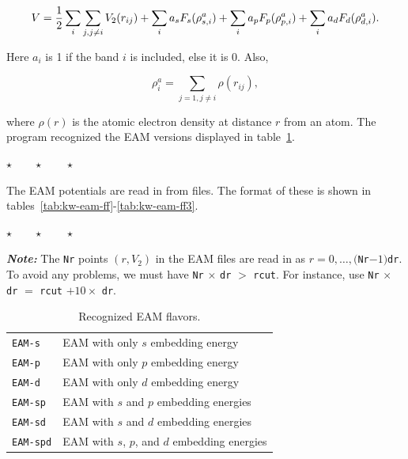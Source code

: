 \documentclass[a4paper,12pt,pdftex,onecolumn]{article}
\newcommand{\stars}{\begin{center}%
\vspace{1em plus 0.5em minus 0.5em}%
$\star \qquad \star \qquad \star$%
\vspace{1em plus 0.5em minus 0.5em}%
\end{center}}
\begin{document}
\begin{equation}
V = {1 \over 2} \sum_i \sum_{j, j \neq i} V_2(r_{ij})
+ \sum_i a_s F_s(\rho^a_{s,i})
+ \sum_i a_p F_p(\rho^a_{p,i})
+ \sum_i a_d F_d(\rho^a_{d,i}).
\end{equation}

Here $a_i$ is 1 if the band $i$ is included, else it is 0.
Also,

\begin{equation}
\rho^a_i = \sum_{j=1, j\neq i} \rho(r_{ij}),
\end{equation}

where $\rho(r)$ is the atomic electron density at distance $r$
from an atom. The program recognized the EAM versions displayed
in table~\ref{tab:kw-eam}.

\stars



The EAM potentials are read in from files. The format of these
is shown in tables~\ref{tab:kw-eam-ff}-\ref{tab:kw-eam-ff3}.

\stars

{\large \textit{\textbf{Note:}}} The \verb+Nr+ points $(r, V_2)$
in the EAM files are read in as
$r = 0, \ldots,($\verb+Nr+$-1)$\verb+dr+.
To avoid any problems, we must have \verb+Nr+ $\times$ \verb+dr+ $>$ \verb+rcut+.
For instance, use 
\verb+Nr+ $\times$ \verb+dr+ $=$ \verb+rcut+ $+ 10 \times$ \verb+dr+.



\begin{table}[!h]
\caption{
Recognized EAM flavors.
\label{tab:kw-eam}
}
\begin{center}
\begin{tabular}{|l|l|}
\hline
\hline
\verb+EAM-s+         & EAM with only $s$ embedding energy \\
\verb+EAM-p+         & EAM with only $p$ embedding energy \\
\verb+EAM-d+         & EAM with only $d$ embedding energy \\
\verb+EAM-sp+        & EAM with $s$ and $p$ embedding energies \\
\verb+EAM-sd+        & EAM with $s$ and $d$ embedding energies \\
\verb+EAM-spd+       & EAM with $s$, $p$, and $d$ embedding energies \\
\hline
\hline
\end{tabular}
\end{center}
\end{table}
\end{document}
